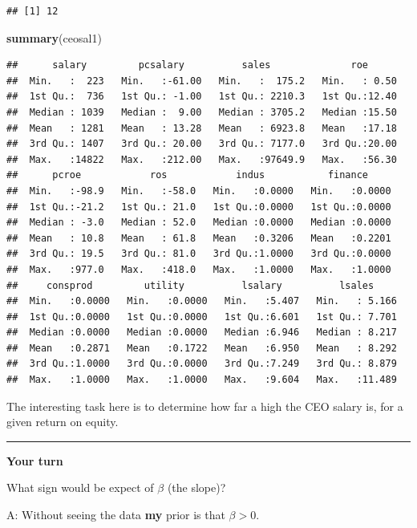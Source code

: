 \documentclass[]{book}
\newenvironment{Shaded}{\begin{snugshade}}{\end{snugshade}}
\newcommand{\KeywordTok}[1]{\textcolor[rgb]{0.13,0.29,0.53}{\textbf{#1}}}
\newcommand{\NormalTok}[1]{#1}
\begin{document}
\begin{verbatim}
## [1] 12
\end{verbatim}

\begin{Shaded}
\begin{Highlighting}[]
\KeywordTok{summary}\NormalTok{(ceosal1)}
\end{Highlighting}
\end{Shaded}

\begin{verbatim}
##      salary         pcsalary          sales              roe       
##  Min.   :  223   Min.   :-61.00   Min.   :  175.2   Min.   : 0.50  
##  1st Qu.:  736   1st Qu.: -1.00   1st Qu.: 2210.3   1st Qu.:12.40  
##  Median : 1039   Median :  9.00   Median : 3705.2   Median :15.50  
##  Mean   : 1281   Mean   : 13.28   Mean   : 6923.8   Mean   :17.18  
##  3rd Qu.: 1407   3rd Qu.: 20.00   3rd Qu.: 7177.0   3rd Qu.:20.00  
##  Max.   :14822   Max.   :212.00   Max.   :97649.9   Max.   :56.30  
##      pcroe            ros            indus           finance      
##  Min.   :-98.9   Min.   :-58.0   Min.   :0.0000   Min.   :0.0000  
##  1st Qu.:-21.2   1st Qu.: 21.0   1st Qu.:0.0000   1st Qu.:0.0000  
##  Median : -3.0   Median : 52.0   Median :0.0000   Median :0.0000  
##  Mean   : 10.8   Mean   : 61.8   Mean   :0.3206   Mean   :0.2201  
##  3rd Qu.: 19.5   3rd Qu.: 81.0   3rd Qu.:1.0000   3rd Qu.:0.0000  
##  Max.   :977.0   Max.   :418.0   Max.   :1.0000   Max.   :1.0000  
##     consprod         utility          lsalary          lsales      
##  Min.   :0.0000   Min.   :0.0000   Min.   :5.407   Min.   : 5.166  
##  1st Qu.:0.0000   1st Qu.:0.0000   1st Qu.:6.601   1st Qu.: 7.701  
##  Median :0.0000   Median :0.0000   Median :6.946   Median : 8.217  
##  Mean   :0.2871   Mean   :0.1722   Mean   :6.950   Mean   : 8.292  
##  3rd Qu.:1.0000   3rd Qu.:0.0000   3rd Qu.:7.249   3rd Qu.: 8.879  
##  Max.   :1.0000   Max.   :1.0000   Max.   :9.604   Max.   :11.489
\end{verbatim}

The interesting task here is to determine how far a high the CEO salary
is, for a given return on equity.

\begin{center}\rule{0.5\linewidth}{\linethickness}\end{center}

\textbf{Your turn}

What sign would be expect of \(\beta\) (the slope)?

A: Without seeing the data \textbf{my} prior is that \(\beta > 0\).
\end{document}
